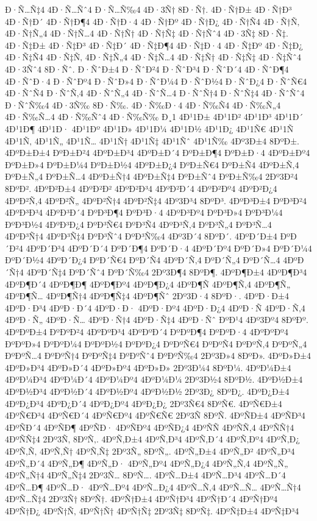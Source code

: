 {Ð·Ñ…Ñ‡4
4Ð·Ñ…Ñˆ4
Ð·Ñ…Ñ‰4
4Ð·3Ñ†
8Ð·Ñ†.
4Ð·Ñ†Ð±
4Ð·Ñ†Ð³
4Ð·Ñ†Ð´
4Ð·Ñ†Ð¶4
4Ð·Ñ†Ð·4
4Ð·Ñ†Ðº
4Ð·Ñ†Ð¿
4Ð·Ñ†Ñ4
4Ð·Ñ†Ñ‚
4Ð·Ñ†Ñ„4
4Ð·Ñ†Ñ…4
4Ð·Ñ†Ñ†
4Ð·Ñ†Ñ‡
4Ð·Ñ†Ñˆ4
4Ð·3Ñ‡
8Ð·Ñ‡.
4Ð·Ñ‡Ð±
4Ð·Ñ‡Ð³
4Ð·Ñ‡Ð´
4Ð·Ñ‡Ð¶4
4Ð·Ñ‡Ð·4
4Ð·Ñ‡Ðº
4Ð·Ñ‡Ð¿
4Ð·Ñ‡Ñ4
4Ð·Ñ‡Ñ‚
4Ð·Ñ‡Ñ„4
4Ð·Ñ‡Ñ…4
4Ð·Ñ‡Ñ†
4Ð·Ñ‡Ñ‡
4Ð·Ñ‡Ñˆ4
4Ð·3Ñˆ4
8Ð·Ñˆ.
Ð·ÑˆÐ±4
Ð·ÑˆÐ²4
Ð·ÑˆÐ³4
Ð·ÑˆÐ´4
4Ð·ÑˆÐ¶4
4Ð·ÑˆÐ·4
Ð·ÑˆÐº4
Ð·ÑˆÐ»4
Ð·ÑˆÐ¼4
Ð·ÑˆÐ½4
Ð·ÑˆÐ¿4
Ð·ÑˆÑ€4
4Ð·ÑˆÑ4
Ð·ÑˆÑ‚4
4Ð·ÑˆÑ„4
4Ð·ÑˆÑ…4
Ð·ÑˆÑ†4
Ð·ÑˆÑ‡4
4Ð·ÑˆÑˆ4
Ð·ÑˆÑ‰4
4Ð·3Ñ‰
8Ð·Ñ‰.
4Ð·Ñ‰Ð·4
4Ð·Ñ‰Ñ4
4Ð·Ñ‰Ñ„4
4Ð·Ñ‰Ñ…4
4Ð·Ñ‰Ñˆ4
4Ð·Ñ‰Ñ‰
Ð¸1
4Ð¹1Ð±
4Ð¹1Ð²
4Ð¹1Ð³
4Ð¹1Ð´
4Ð¹1Ð¶
4Ð¹1Ð·
4Ð¹1Ðº
4Ð¹1Ð»
4Ð¹1Ð¼
4Ð¹1Ð½
4Ð¹1Ð¿
4Ð¹1Ñ€
4Ð¹1Ñ
4Ð¹1Ñ‚
4Ð¹1Ñ„
4Ð¹1Ñ…
4Ð¹1Ñ†
4Ð¹1Ñ‡
4Ð¹1Ñˆ
4Ð¹1Ñ‰
4Ðº3Ð±4
8ÐºÐ±.
4ÐºÐ±Ð±4
ÐºÐ±Ð²4
4ÐºÐ±Ð³4
4ÐºÐ±Ð´4
ÐºÐ±Ð¶4
ÐºÐ±Ð·4
4ÐºÐ±Ðº4
ÐºÐ±Ð»4
ÐºÐ±Ð¼4
ÐºÐ±Ð½4
4ÐºÐ±Ð¿4
ÐºÐ±Ñ€4
ÐºÐ±Ñ4
4ÐºÐ±Ñ‚4
ÐºÐ±Ñ„4
ÐºÐ±Ñ…4
4ÐºÐ±Ñ†4
4ÐºÐ±Ñ‡4
ÐºÐ±Ñˆ4
ÐºÐ±Ñ‰4
2Ðº3Ð²4
8ÐºÐ².
4ÐºÐ²Ð±4
4ÐºÐ²Ð²
4ÐºÐ²Ð³4
4ÐºÐ²Ð´4
4ÐºÐ²Ðº4
4ÐºÐ²Ð¿4
4ÐºÐ²Ñ‚4
4ÐºÐ²Ñ„
4ÐºÐ²Ñ†4
4ÐºÐ²Ñ‡4
4Ðº3Ð³4
8ÐºÐ³.
4ÐºÐ³Ð±4
ÐºÐ³Ð²4
4ÐºÐ³Ð³4
4ÐºÐ³Ð´4
ÐºÐ³Ð¶4
ÐºÐ³Ð·4
4ÐºÐ³Ðº4
ÐºÐ³Ð»4
ÐºÐ³Ð¼4
ÐºÐ³Ð½4
4ÐºÐ³Ð¿4
ÐºÐ³Ñ€4
ÐºÐ³Ñ4
4ÐºÐ³Ñ‚4
ÐºÐ³Ñ„4
ÐºÐ³Ñ…4
4ÐºÐ³Ñ†4
4ÐºÐ³Ñ‡4
ÐºÐ³Ñˆ4
ÐºÐ³Ñ‰4
4Ðº3Ð´4
8ÐºÐ´.
4ÐºÐ´Ð±4
ÐºÐ´Ð²4
4ÐºÐ´Ð³4
4ÐºÐ´Ð´4
ÐºÐ´Ð¶4
ÐºÐ´Ð·4
4ÐºÐ´Ðº4
ÐºÐ´Ð»4
ÐºÐ´Ð¼4
ÐºÐ´Ð½4
4ÐºÐ´Ð¿4
ÐºÐ´Ñ€4
ÐºÐ´Ñ4
4ÐºÐ´Ñ‚4
ÐºÐ´Ñ„4
ÐºÐ´Ñ…4
4ÐºÐ´Ñ†4
4ÐºÐ´Ñ‡4
ÐºÐ´Ñˆ4
ÐºÐ´Ñ‰4
2Ðº3Ð¶4
8ÐºÐ¶.
4ÐºÐ¶Ð±4
4ÐºÐ¶Ð³4
4ÐºÐ¶Ð´4
4ÐºÐ¶Ð¶
4ÐºÐ¶Ðº4
4ÐºÐ¶Ð¿4
4ÐºÐ¶Ñ
4ÐºÐ¶Ñ‚4
4ÐºÐ¶Ñ„
4ÐºÐ¶Ñ…
4ÐºÐ¶Ñ†4
4ÐºÐ¶Ñ‡4
4ÐºÐ¶Ñˆ
2Ðº3Ð·4
8ÐºÐ·.
4ÐºÐ·Ð±4
4ÐºÐ·Ð³4
4ÐºÐ·Ð´4
4ÐºÐ·Ð·
4ÐºÐ·Ðº4
4ÐºÐ·Ð¿4
4ÐºÐ·Ñ
4ÐºÐ·Ñ‚4
4ÐºÐ·Ñ„
4ÐºÐ·Ñ…
4ÐºÐ·Ñ†4
4ÐºÐ·Ñ‡4
4ÐºÐ·Ñˆ
ÐºÐ¹4
4Ðº3Ðº4
8ÐºÐº.
4ÐºÐºÐ±4
ÐºÐºÐ²4
4ÐºÐºÐ³4
4ÐºÐºÐ´4
ÐºÐºÐ¶4
ÐºÐºÐ·4
4ÐºÐºÐº4
ÐºÐºÐ»4
ÐºÐºÐ¼4
ÐºÐºÐ½4
ÐºÐºÐ¿4
ÐºÐºÑ€4
ÐºÐºÑ4
ÐºÐºÑ‚4
ÐºÐºÑ„4
ÐºÐºÑ…4
ÐºÐºÑ†4
ÐºÐºÑ‡4
ÐºÐºÑˆ4
ÐºÐºÑ‰4
2Ðº3Ð»4
8ÐºÐ».
4ÐºÐ»Ð±4
4ÐºÐ»Ð³4
4ÐºÐ»Ð´4
4ÐºÐ»Ðº4
4ÐºÐ»Ð»
2Ðº3Ð¼4
8ÐºÐ¼.
4ÐºÐ¼Ð±4
4ÐºÐ¼Ð³4
4ÐºÐ¼Ð´4
4ÐºÐ¼Ðº4
4ÐºÐ¼Ð¼
2Ðº3Ð½4
8ÐºÐ½.
4ÐºÐ½Ð±4
4ÐºÐ½Ð³4
4ÐºÐ½Ð´4
4ÐºÐ½Ðº4
4ÐºÐ½Ð½
2Ðº3Ð¿
8ÐºÐ¿.
4ÐºÐ¿Ð±4
4ÐºÐ¿Ð³4
4ÐºÐ¿Ð´4
4ÐºÐ¿Ðº4
4ÐºÐ¿Ð¿
2Ðº3Ñ€4
8ÐºÑ€.
4ÐºÑ€Ð±4
4ÐºÑ€Ð³4
4ÐºÑ€Ð´4
4ÐºÑ€Ðº4
4ÐºÑ€Ñ€
2Ðº3Ñ
8ÐºÑ.
4ÐºÑÐ±4
4ÐºÑÐ³4
4ÐºÑÐ´4
4ÐºÑÐ¶
4ÐºÑÐ·
4ÐºÑÐº4
4ÐºÑÐ¿4
4ÐºÑÑ
4ÐºÑÑ‚4
4ÐºÑÑ†4
4ÐºÑÑ‡4
2Ðº3Ñ‚
8ÐºÑ‚.
4ÐºÑ‚Ð±4
4ÐºÑ‚Ð³4
4ÐºÑ‚Ð´4
4ÐºÑ‚Ðº4
4ÐºÑ‚Ð¿
4ÐºÑ‚Ñ‚
4ÐºÑ‚Ñ†
4ÐºÑ‚Ñ‡
2Ðº3Ñ„
8ÐºÑ„.
4ÐºÑ„Ð±4
4ÐºÑ„Ð²
4ÐºÑ„Ð³4
4ÐºÑ„Ð´4
4ÐºÑ„Ð¶
4ÐºÑ„Ð·
4ÐºÑ„Ðº4
4ÐºÑ„Ð¿4
4ÐºÑ„Ñ‚4
4ÐºÑ„Ñ„
4ÐºÑ„Ñ†4
4ÐºÑ„Ñ‡4
2Ðº3Ñ…
8ÐºÑ….
4ÐºÑ…Ð±4
4ÐºÑ…Ð³4
4ÐºÑ…Ð´4
4ÐºÑ…Ð¶
4ÐºÑ…Ð·
4ÐºÑ…Ðº4
4ÐºÑ…Ð¿4
4ÐºÑ…Ñ‚4
4ÐºÑ…Ñ…
4ÐºÑ…Ñ†4
4ÐºÑ…Ñ‡4
2Ðº3Ñ†
8ÐºÑ†.
4ÐºÑ†Ð±4
4ÐºÑ†Ð³4
4ÐºÑ†Ð´4
4ÐºÑ†Ðº4
4ÐºÑ†Ð¿
4ÐºÑ†Ñ‚
4ÐºÑ†Ñ†
4ÐºÑ†Ñ‡
2Ðº3Ñ‡
8ÐºÑ‡.
4ÐºÑ‡Ð±4
4ÐºÑ‡Ð³4
}
